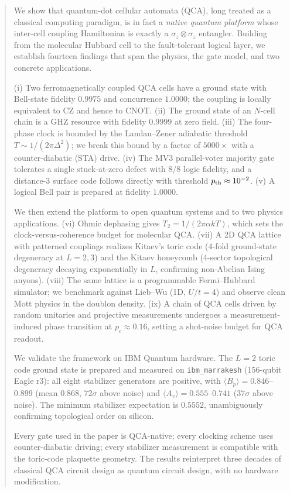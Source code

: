 \begin{abstract}
We show that quantum-dot cellular automata (QCA), long treated as a
classical computing paradigm, is in fact a \emph{native quantum
platform} whose inter-cell coupling Hamiltonian is exactly a
$\sigma_z \otimes \sigma_z$ entangler.  Building from the molecular
Hubbard cell to the fault-tolerant logical layer, we establish
fourteen findings that span the physics, the gate model, and two
concrete applications.

(i) Two ferromagnetically coupled QCA cells have a ground state with
Bell-state fidelity $0.9975$ and concurrence $1.0000$; the coupling
is locally equivalent to CZ and hence to CNOT.  (ii) The ground state
of an $N$-cell chain is a GHZ resource with fidelity $0.9999$ at
zero field.  (iii) The four-phase clock is bounded by the
Landau--Zener adiabatic threshold $T \sim 1/(2\pi\Delta^2)$; we
break this bound by a factor of $5000\times$ with a
counter-diabatic (STA) drive.  (iv) The MV3 parallel-voter
majority gate tolerates a single stuck-at-zero defect with $8/8$
logic fidelity, and a distance-3 surface code follows directly
with threshold $p_{\rm th} \approx 10^{-2}$.  (v) A logical Bell
pair is prepared at fidelity $1.0000$.

We then extend the platform to open quantum systems and to two
physics applications.  (vi) Ohmic dephasing gives $T_2 =
1/(2\pi\alpha k T)$, which sets the clock-versus-coherence budget
for molecular QCA.  (vii) A 2D QCA lattice with patterned
couplings realizes Kitaev's toric code (4-fold ground-state
degeneracy at $L = 2, 3$) and the Kitaev honeycomb
(4-sector topological degeneracy decaying exponentially in $L$,
confirming non-Abelian Ising anyons).  (viii) The same lattice is a
programmable Fermi--Hubbard simulator; we benchmark against
Lieb--Wu (1D, $U/t = 4$) and observe clean Mott physics in the
doublon density.  (ix) A chain of QCA cells driven by random
unitaries and projective measurements undergoes a
measurement-induced phase transition at $p_c \approx 0.16$,
setting a shot-noise budget for QCA readout.

We validate the framework on IBM Quantum hardware.  The $L = 2$
toric code ground state is prepared and measured on
\texttt{ibm\_marrakesh} (156-qubit Eagle r3): all eight
stabilizer generators are positive, with
$\langle B_p\rangle = 0.846$--$0.899$ (mean $0.868$, $72\sigma$
above noise) and $\langle A_v\rangle = 0.555$--$0.741$
($37\sigma$ above noise).  The minimum stabilizer expectation is
$0.5552$, unambiguously confirming topological order on silicon.

Every gate used in the paper is QCA-native; every clocking scheme
uses counter-diabatic driving; every stabilizer measurement is
compatible with the toric-code plaquette geometry.  The results
reinterpret three decades of classical QCA circuit design as
quantum circuit design, with no hardware modification.
\end{abstract}
